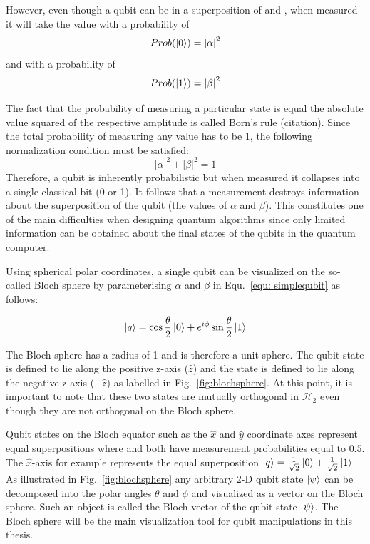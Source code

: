 However, even though a qubit can be in a superposition of \0 and \1, when measured it will take the value \0 with a probability of
\begin{equation}
\label{equ:bornrule0}
Prob(\ket{0}) = {|\alpha|}^{2}
\end{equation}
and \1 with a probability of 
\begin{equation}
\label{equ:bornrule1}
Prob(\ket{1}) = {|\beta|}^{2}
\end{equation}

The fact that the probability of measuring a particular state is equal the absolute value squared of the respective amplitude is called Born's rule (citation). Since the total probability of measuring any value has to be 1, the following normalization condition must be satisfied:
\begin{equation}
\label{equ: normalization}
{|\alpha|}^{2} + {|\beta|}^{2} =  1
\end{equation}
Therefore, a qubit is inherently probabilistic but when measured it collapses into a single classical bit (0 or 1). It follows that a measurement destroys information about the superposition of the qubit (the values of $\alpha$ and $\beta$). This constitutes one of the main difficulties when designing quantum algorithms since only limited information can be obtained about the final states of the qubits in the quantum computer.

Using spherical polar coordinates, a single qubit can be visualized on the so-called Bloch sphere by parameterising $\alpha$ and $\beta$ in Equ.~\ref{equ: simplequbit} as follows:

\begin{equation}
\label{equ: blochqubit}
\ket{q} = \cos\frac{\theta}{2} \ket{0} + e^{i \phi} \sin\frac{\theta}{2} \ket{1}
\end{equation}

The Bloch sphere has a radius of 1 and is therefore a unit sphere. The \0 qubit state is defined to lie along the positive z-axis ($\hat{z}$) and the \1 state is defined to lie along the negative z-axis ($-\hat{z}$) as labelled in Fig.~\ref{fig:blochsphere}. At this point, it is important to note that these two states are mutually orthogonal in $\mathcal{H}_{2}$ even though they are not orthogonal on the Bloch sphere. 

Qubit states on the Bloch equator such as the $\hat{x}$ and $\hat{y}$ coordinate axes represent equal superpositions where \0 and \1 both have measurement probabilities equal to $0.5$. The $\hat{x}$-axis for example represents the equal superposition $\ket{q} = \frac{1}{\sqrt{2}} \ket{0} + \frac{1}{\sqrt{2}} \ket{1}$. As illustrated in Fig.~\ref{fig:blochsphere} any arbitrary 2-D qubit state $\ket{\psi}$ can be decomposed into the polar angles $\theta$ and $\phi$ and visualized as a vector on the Bloch sphere. Such an object is called the Bloch vector of the qubit state $\ket{\psi}$. The Bloch sphere will be the main visualization tool for qubit manipulations in this thesis.

